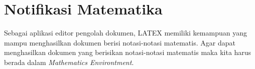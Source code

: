 \section{Notifikasi Matematika}
Sebagai aplikasi editor pengolah dokumen, LATEX memiliki kemampuan yang mampu menghasilkan dokumen berisi notasi-notasi matematis. Agar dapat menghasilkan dokumen yang berisikan notasi-notasi matematis maka kita harus berada dalam \textit{Mathematics Environtment}.